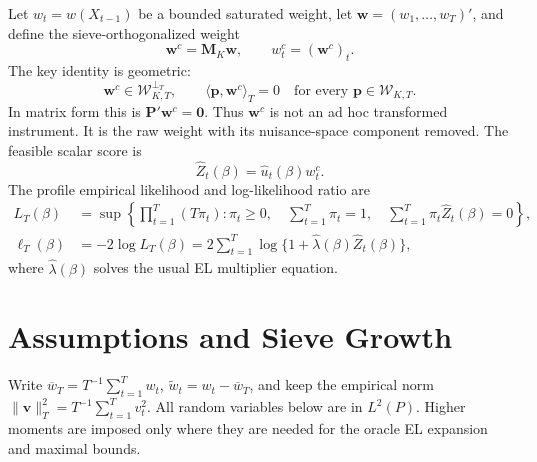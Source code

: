 ﻿\documentclass[11pt]{article}
\begin{document}
Let \(w_t=w(X_{t-1})\) be a bounded saturated weight, let \(\bm w=(w_1,\ldots,w_T)'\), and define the sieve-orthogonalized weight
\begin{equation}
    \bm w^c=\bm M_K\bm w,
    \qquad
    w_t^c=(\bm w^c)_t.
    \label{eq:geo-weight}
\end{equation}
The key identity is geometric:
\[
    \bm w^c\in\mathcal W_{K,T}^{\perp_T},
    \qquad
    \langle \bm p,\bm w^c\rangle_T=0
    \quad\text{for every }\bm p\in\mathcal W_{K,T}.
\]
In matrix form this is \(\bm P'\bm w^c=\bm0\). Thus \(\bm w^c\) is not an ad hoc transformed instrument. It is the raw weight with its nuisance-space component removed. The feasible scalar score is
\begin{equation}
    \widehat Z_t(\beta)=\widehat u_t(\beta)w_t^c.
    \label{eq:geo-score}
\end{equation}
The profile empirical likelihood and log-likelihood ratio are
\begin{align}
    L_T(\beta)
    &=\sup\left\{
       \prod_{t=1}^T(T\pi_t):
       \pi_t\geq0,\quad
       \sum_{t=1}^T\pi_t=1,\quad
       \sum_{t=1}^T\pi_t\widehat Z_t(\beta)=0
       \right\},                                                    \label{eq:geo-el}\\
    \ell_T(\beta)
    &=-2\log L_T(\beta)
      =2\sum_{t=1}^T\log\{1+\widehat\lambda(\beta)\widehat Z_t(\beta)\},
      \label{eq:geo-elr}
\end{align}
where \(\widehat\lambda(\beta)\) solves the usual EL multiplier equation.

\section{Assumptions and Sieve Growth}

Write \(\overline w_T=T^{-1}\sum_{t=1}^T w_t\), \(\widetilde w_t=w_t-\overline w_T\), and keep the empirical norm \(\|\bm v\|_T^2=T^{-1}\sum_{t=1}^T v_t^2\). All random variables below are in \(L^2(P)\). Higher moments are imposed only where they are needed for the oracle EL expansion and maximal bounds.
\end{document}
